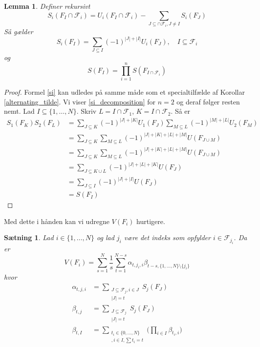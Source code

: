\documentclass[a4paper, 12pt]{article}
\newtheorem{lemma}{Lemma}
\newtheorem{saetning}{Sætning}
\begin{document}
\begin{lemma}\label{tilde_sis}
Definer rekursivt
\begin{equation}
 S_i(F_I\cap \mathcal F_i)= U_i(F_I\cap \mathcal F_i)-\sum_{J\subseteq \cap \mathcal F_i, J\neq I} S_i(F_J)
\end{equation}
Så gælder 
\begin{equation}
 S_i(F_I)=\sum_{J\subseteq I}(-1)^{|J|+|I|} U_i(F_J), \quad I\subseteq \mathcal F_i\label{si}
\end{equation}
og
\begin{equation}
 S(F_I)=\prod_{i=1}^n  S(F_{I\cap \mathcal F_i})\label{si_decomposition}
\end{equation}
\end{lemma}
\begin{proof}
Formel \eqref{si} kan udledes på samme måde som et specialtilfælde af Korollar \ref{alternating_tilde}. Vi viser \eqref{si_decomposition} for $n=2$ og deraf følger resten nemt. Lad $I\subseteq \{1, \dots, N\}$. Skriv $L=I\cap \mathcal F_1$, $K=I\cap \mathcal F_2$. Så er
\begin{align*}
 S_1(F_K) S_2(F_L)&=\sum_{J\subseteq K} (-1)^{|J|+|K|} U_1(F_J)\sum_{M\subseteq L} (-1)^{|M|+|L|} U_2(F_M)\\
&=\sum_{J\subseteq K}\sum_{M\subseteq L} (-1)^{|J|+|K|+|L|+|M|} U(F_{J\cup M})\\
&=\sum_{J\subseteq K}\sum_{M\subseteq L} (-1)^{|J|+|K|+|L|+|M|} U(F_{J\cup M})\\
&=\sum_{J\subseteq K\cup L}(-1)^{|J|+|L|+|K|} U(F_J)\\
&=\sum_{J\subseteq I}(-1)^{|J|+|I|} U(F_J)\\
&= S(F_I)
\end{align*}
\end{proof}
Med dette i hånden kan vi udregne $ V(F_i)$ hurtigere.
\begin{saetning}\label{saetning_fast_computation}
Lad $i\in \{1, \dots, N\}$ og lad $j_i$ være det indeks som opfylder $i\in \mathcal F_{j_i}$. Da er
\begin{equation}
 V(F_i)=\sum_{s=1}^N\frac{1}{s}\sum_{t=1}^{N-s}\alpha_{t,{j_i},i}\beta_{t-s, \{1, \dots, N\}\setminus \{j_i\}}
\end{equation}
hvor \begin{align}
\alpha_{t,j,i}&=\sum_{\substack{J\subseteq \mathcal F_j, i\in J\\ |J|=t}} S_j(F_{J})\\
\beta_{t,j}&=\sum_{\substack{J\subseteq \mathcal F_j\\ |J|=t}} S_j(F_{J})\\
\beta_{t,I}&=\sum_{\substack{t_i\in \{0, \dots, N\}\\,
i\in I, \sum t_i=t}} \Biggl(\prod_{i\in I} \beta_{t_i,i}\Biggr)
\end{align}
\end{saetning}
\end{document}
